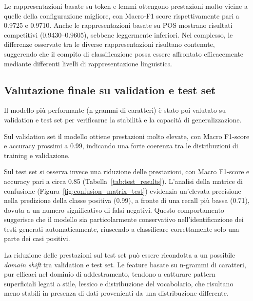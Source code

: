 \documentclass{article}
\begin{document}
Le rappresentazioni basate su token e lemmi ottengono prestazioni molto vicine a quelle della configurazione migliore, con Macro-F1 score rispettivamente pari a 0.9725 e 0.9710. Anche le rappresentazioni basate su POS mostrano risultati competitivi (0.9430--0.9605), sebbene leggermente inferiori. Nel complesso, le differenze osservate tra le diverse rappresentazioni risultano contenute, suggerendo che il compito di classificazione possa essere affrontato efficacemente mediante differenti livelli di rappresentazione linguistica.

\subsection{Valutazione finale su validation e test set}

Il modello più performante (n-grammi di caratteri) è stato poi valutato su validation e test set per verificarne la stabilità e la capacità di generalizzazione.

Sul validation set il modello ottiene prestazioni molto elevate, con Macro F1-score e accuracy prossimi a 0.99, indicando una forte coerenza tra le distribuzioni di training e validazione.

Sul test set si osserva invece una riduzione delle prestazioni, con Macro F1-score e accuracy pari a circa 0.85 (Tabella~\ref{tab:test_results}). L’analisi della matrice di confusione (Figura~\ref{fig:confusion_matrix_test}) evidenzia un’elevata precisione nella predizione della classe positiva (0.99), a fronte di una recall più bassa (0.71), dovuta a un numero significativo di falsi negativi. Questo comportamento suggerisce che il modello sia particolarmente conservativo nell’identificazione dei testi generati automaticamente, riuscendo a classificare correttamente solo una parte dei casi positivi.

La riduzione delle prestazioni sul test set può essere ricondotta a un possibile \textit{domain shift} tra validation e test set. Le feature basate su n-grammi di caratteri, pur efficaci nel dominio di addestramento, tendono a catturare pattern superficiali legati a stile, lessico e distribuzione del vocabolario, che risultano meno stabili in presenza di dati provenienti da una distribuzione differente.
\end{document}
